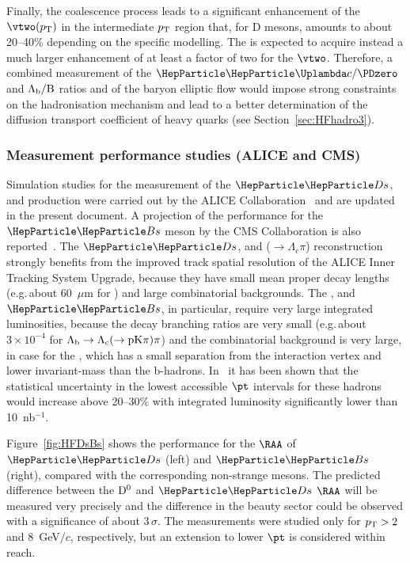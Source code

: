Finally, the coalescence process leads to a significant enhancement of the $\vtwo(\pT)$ in the
intermediate $p\sb{\scriptstyle\mathrm{T}}$ region that, for D mesons, amounts to about 20--40\% depending on the
specific modelling. The \PGLc is expected to acquire instead a much 
larger enhancement of at least a factor of two for the $\vtwo$. Therefore, a combined measurement of the
$\PGLc/\PDzero$ and $\rm \Lambda_b/B$ ratios and of the baryon elliptic flow would impose strong constraints
on the hadronisation mechanism and lead to a better determination of the diffusion transport coefficient of heavy quarks (see Section~\ref{sec:HFhadro3}).

\subsubsection{Measurement performance studies (ALICE and CMS)}
\label{sec:HFhadro2}


Simulation studies for the measurement of the $\PDs$, \PGLc and \PGLb
production were carried out by the ALICE Collaboration~\cite{Abelev:1625842} and are updated in the present document. A projection of the performance for the $\PBs$ meson by the CMS Collaboration is also reported~\cite{CMS-PAS-FTR-17-002}. The $\PDs$, \PGLc and \PGLb ($\to\Lambda_c\pi$) reconstruction strongly benefits from the improved track spatial resolution of the ALICE Inner Tracking System Upgrade, because they have small mean proper decay lengths (e.g.\,about 60~$\mu$m for \PGLc)
and large combinatorial backgrounds. The \PGLc, \PGLb and $\PBs$, in particular, require very large integrated luminosities, because the decay branching ratios are very small (e.g.\,about $3\times 10^{-4}$ for $\rm \Lambda_b\to\Lambda_c(\to pK\pi)\pi$) and the combinatorial background is very large, in case for the \PGLc, which has a small separation from the interaction vertex and lower invariant-mass than the b-hadrons. In~\cite{CMS-PAS-FTR-17-002} it has been shown that the statistical uncertainty in the lowest accessible $\pt$ intervals for these hadrons would increase above 20--30\% with integrated luminosity significantly lower than 10~nb$^{-1}$.

Figure~\ref{fig:HFDsBs} shows the performance for the $\RAA$ of $\PDs$ (left) and $\PBs$ (right), compared with the corresponding non-strange mesons. The predicted difference between the $\rm D^0$ and $\PDs$ $\RAA$ will be measured very precisely and the difference in the beauty sector could be observed with a significance of about 3\,$\sigma$.
The measurements were studied only for $p_{\rm T}>2$ and 8~GeV$/c$, respectively, but an extension to lower $\pt$ is considered within reach.

